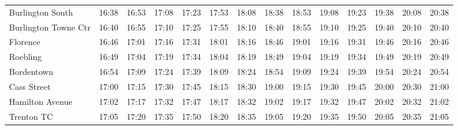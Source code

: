\begin{center}
\begin{tabular}{@{}lrrrrrrrrrrrrr@{}}
Burlington South & 16:38 & 16:53 & 17:08 & 17:23 & 17:53 & 18:08 & 18:38 & 18:53 & 19:08 & 19:23 & 19:38 & 20:08 & 20:38 \\
Burlington Towne Ctr & 16:40 & 16:55 & 17:10 & 17:25 & 17:55 & 18:10 & 18:40 & 18:55 & 19:10 & 19:25 & 19:40 & 20:10 & 20:40 \\
Florence & 16:46 & 17:01 & 17:16 & 17:31 & 18:01 & 18:16 & 18:46 & 19:01 & 19:16 & 19:31 & 19:46 & 20:16 & 20:46 \\
Roebling & 16:49 & 17:04 & 17:19 & 17:34 & 18:04 & 18:19 & 18:49 & 19:04 & 19:19 & 19:34 & 19:49 & 20:19 & 20:49 \\
Bordentown & 16:54 & 17:09 & 17:24 & 17:39 & 18:09 & 18:24 & 18:54 & 19:09 & 19:24 & 19:39 & 19:54 & 20:24 & 20:54 \\
Cass Street & 17:00 & 17:15 & 17:30 & 17:45 & 18:15 & 18:30 & 19:00 & 19:15 & 19:30 & 19:45 & 20:00 & 20:30 & 21:00 \\
Hamilton Avenue & 17:02 & 17:17 & 17:32 & 17:47 & 18:17 & 18:32 & 19:02 & 19:17 & 19:32 & 19:47 & 20:02 & 20:32 & 21:02 \\
Trenton TC & 17:05 & 17:20 & 17:35 & 17:50 & 18:20 & 18:35 & 19:05 & 19:20 & 19:35 & 19:50 & 20:05 & 20:35 & 21:05 \\
\bottomrule\end{tabular}\end{center}
